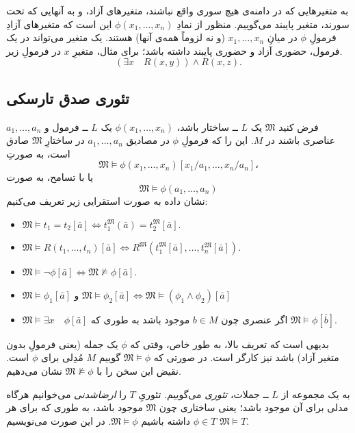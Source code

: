 \documentclass[12pt,a4paper]{article}
\theoremstyle{colorhead}
\begin{document}
به متغیرهایی که در دامنه‌ی هیچ سوری واقع نباشند، متغیرهای آزاد، و به آنهایی که 
تحت سورند، متغیر پایبند می‌گوییم. منظور از نمادِ
$\phi(x_1,\ldots,x_n)$
این است که متغیرهای آزادِ 
فرمولِ
$\phi$
در میانِ
$x_1,\ldots,x_n$
(و نه لزوماً‌ همه‌ی آنها)
هستند. یک متغیر می‌تواند در یک فرمول،‌ حضوری آزاد و حضوری پایبند داشته باشد؛ برای مثال، متغیرِ
$x$
در فرمولِ زیر.
\[
(\exists x\quad R(x,y))\wedge R(x,z).
\]
\subsection{ تئوری صدق تارسکی}
فرض کنید
$\mathfrak{M}$
یک 
$L$ ــ‌
ساختار باشد،
$\phi(x_1,\ldots,x_n)$
یک
$L$
ــ‌ فرمول و
$a_1,\ldots,a_n$
عناصری باشند
در
$M$.
 این را که فرمولِ
 $\phi$
 در مصادیق
 $a_1,\ldots,a_n$
 در ساختارِ
 $\mathfrak{M}$
 صادق است، به صورتِ
 \[
 \mathfrak{M}\models \phi(x_1,\ldots,x_n)[x_1/a_1,\ldots, x_n/a_n]،
 \]
 یا با تسامح،‌ به صورت
 \[
 \mathfrak{M}\models \phi(a_1,\ldots,a_n)
 \]
 نشان داده به صورت استقرایی زیر تعریف می‌کنیم:
\begin{itemize}
\item 
$\mathfrak{M}\models t_1=t_2[\bar{a}]\Leftrightarrow t_1^\mathfrak{M}(\bar{a})=t_2^\mathfrak{M}[\bar{a}]$.
\item 
$\mathfrak{M}\models R(t_1,\ldots,t_n)[\bar{a}]\Leftrightarrow 
R^\mathfrak{M}(t_1^\mathfrak{M}[\bar{a}],\ldots,t_n^\mathfrak{M}[\bar{a}])$.
\item 
$\mathfrak{M}\models \neg \phi[\bar{a}]\Leftrightarrow \mathfrak{M}\not\models
\phi[\bar{a}]$.
\item 
$\mathfrak{M}\models \phi_1[\bar{a}] \text{ و }
\mathfrak{M}\models \phi_2[\bar{a}]
\Leftrightarrow
\mathfrak{M}\models (\phi_1\wedge\phi_2)[\bar{a}]$
\item 
$\mathfrak{M}\models \exists x \quad \phi[\bar{a}]$
اگر عنصری چون
$b\in M$
موجود باشد به طوری که
$\mathfrak{M}\models \phi[\bar{b}]$.
\end{itemize}
\par 
بدیهی است که تعریف بالا، به طور خاص،‌ وقتی که
$\phi$
یک جمله (یعنی فرمولِ بدون متغیر آزاد‌) باشد نیز کارگر است.
در صورتی که
$\mathfrak{M}\models \phi$
گوییم
$M$
مُدِلی برای 
$\phi$
است. نقیض این سخن را با
$\mathfrak{M}\not\models \phi$
نشان می‌دهیم. 
\par 
به یک مجموعه‌ از
$L$ ــ
جملات، 
\textit{تئوری}
می‌گوییم. تئوریِ
$T$
را 
\textit{ارضاشدنی }
می‌خوانیم هرگاه مدلی برای آن موجود باشد؛ یعنی ساختاری چون
$\mathfrak{M}$
موجود باشد،‌ به طوری که برای 
هر
$\phi\in T$
داشته باشیم
$\mathfrak{M}\models \phi$.
در این صورت می‌نویسیم
$\mathfrak{M}\models T$.
\end{document}
